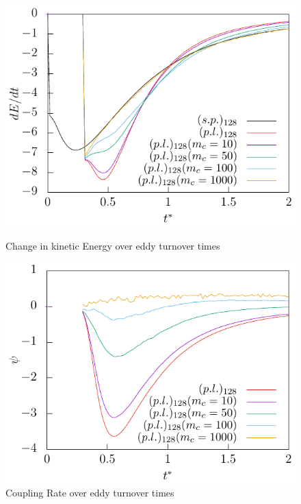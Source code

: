 \documentclass[11pt,a4paper,openany,oneside,parskip=half*]{article}
\begin{document}
\begin{figure}[h]
    \centering
    \begin{minipage}{.5\textwidth}
        \centering
        \includegraphics[width=\linewidth]{./../Simulationsergebnisse/variationWolken/128/der(kineticEnergy)_time.pdf}
        \caption{Change in kinetic Energy over eddy turnover times}
        \label{der(kineticEnergy)_time_128}
    \end{minipage}%
    \begin{minipage}{0.5\textwidth}
        \centering
        \includegraphics[width=\linewidth]{./../Simulationsergebnisse/variationWolken/128/coupling_time.pdf}
        \caption{Coupling Rate over eddy turnover times}
        \label{coupling_time_128}
    \end{minipage}
\end{figure}
\end{document}
